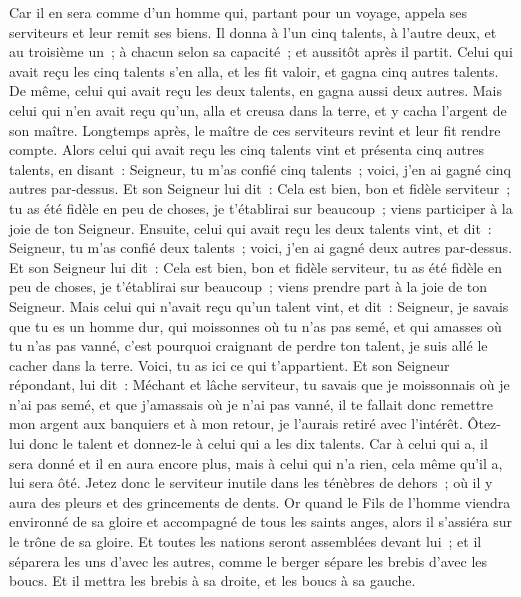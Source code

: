 \begin{multicols}{2}
Car il en sera comme d'un homme qui, partant pour un voyage, appela ses serviteurs et leur remit ses biens.
Il donna à l'un cinq talents, à l'autre deux, et au troisième un~; à chacun selon sa capacité~; et aussitôt après il partit.
Celui qui avait reçu les cinq talents s'en alla, et les fit valoir, et gagna cinq autres talents.
De même, celui qui avait reçu les deux talents, en gagna aussi deux autres.
Mais celui qui n'en avait reçu qu'un, alla et creusa dans la terre, et y cacha l'argent de son maître.
Longtemps après, le maître de ces serviteurs revint et leur fit rendre compte.
Alors celui qui avait reçu les cinq talents vint et présenta cinq autres talents, en disant~: Seigneur, tu m'as confié cinq talents~; voici, j'en ai gagné cinq autres par-dessus.
Et son Seigneur lui dit~: Cela est bien, bon et fidèle serviteur~; tu as été fidèle en peu de choses, je t'établirai sur beaucoup~; viens participer à la joie de ton Seigneur.
Ensuite, celui qui avait reçu les deux talents vint, et dit~: Seigneur, tu m'as confié deux talents~; voici, j'en ai gagné deux autres par-dessus.
Et son Seigneur lui dit~: Cela est bien, bon et fidèle serviteur, tu as été fidèle en peu de choses, je t'établirai sur beaucoup~; viens prendre part à la joie de ton Seigneur.
Mais celui qui n'avait reçu qu'un talent vint, et dit~: Seigneur, je savais que tu es un homme dur, qui moissonnes où tu n'as pas semé, et qui amasses où tu n'as pas vanné,
c'est pourquoi craignant de perdre ton talent, je suis allé le cacher dans la terre. Voici, tu as ici ce qui t'appartient.
Et son Seigneur répondant, lui dit~: Méchant et lâche serviteur, tu savais que je moissonnais où je n'ai pas semé, et que j'amassais où je n'ai pas vanné,
il te fallait donc remettre mon argent aux banquiers et à mon retour, je l'aurais retiré avec l'intérêt.
Ôtez-lui donc le talent et donnez-le à celui qui a les dix talents.
Car à celui qui a, il sera donné et il en aura encore plus, mais à celui qui n'a rien, cela même qu'il a, lui sera ôté.
Jetez donc le serviteur inutile dans les ténèbres de dehors~; où il y aura des pleurs et des grincements de dents.
Or quand le Fils de l'homme viendra environné de sa gloire et accompagné de tous les saints anges, alors il s'assiéra sur le trône de sa gloire.
Et toutes les nations seront assemblées devant lui~; et il séparera les uns d'avec les autres, comme le berger sépare les brebis d'avec les boucs.
Et il mettra les brebis à sa droite, et les boucs à sa gauche.

\end{multicols}
